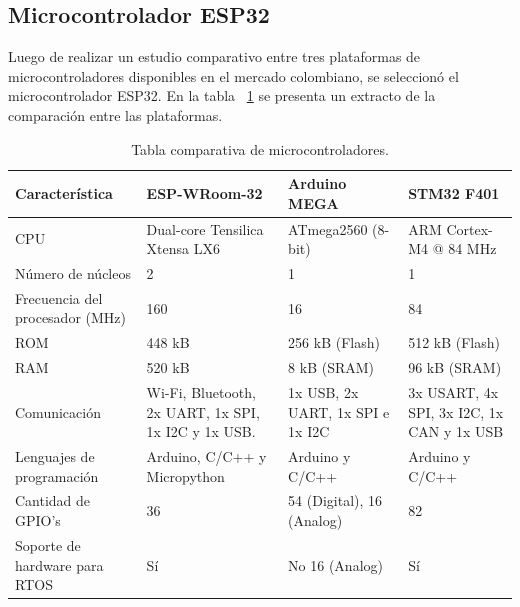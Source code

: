 \subsection{Microcontrolador ESP32}
\label{Microcontrolador}

Luego de realizar un estudio comparativo entre tres plataformas de microcontroladores disponibles en el mercado colombiano, se seleccionó el microcontrolador ESP32. En la tabla ~\ref{tabla:comparativa} se presenta un extracto de la comparación entre las plataformas. 

\begin{table}[h]
    \centering
    \caption{Tabla comparativa de microcontroladores.}
    \begin{tabular}{p{3cm} p{3cm} p{2.5cm} p{2.5cm} }
    \toprule

        \textbf{Característica}           & \textbf{ESP-WRoom-32}               & \textbf{Arduino MEGA}               & \textbf{STM32 F401} \\
        \midrule
        CPU                   & Dual-core Tensilica Xtensa LX6     & ATmega2560 (8-bit)                  & ARM Cortex-M4 @ 84 MHz               \\
        
        Número de núcleos       & 2                                  & 1                                  & 1                                   \\
        
        Frecuencia del procesador (MHz)  & 160                       & 16                                 & 84                                  \\

        ROM             & 448 kB                             & 256 kB (Flash)                     & 512 kB (Flash)                      \\

        RAM             & 520 kB                             & 8 kB (SRAM)                        & 96 kB (SRAM)                        \\

        Comunicación & Wi-Fi, Bluetooth, 2x UART, 1x SPI, 1x I2C y 1x USB.    & 1x USB, 2x UART, 1x SPI e 1x I2C                 & 3x USART, 4x SPI, 3x I2C, 1x CAN y 1x USB  \\

        Lenguajes de programación & Arduino, C/C++ y Micropython  & Arduino y C/C++               & Arduino y C/C++                  \\

        Cantidad de GPIO's        & 36            & 54 (Digital), 16 (Analog)           & 82                                  \\

        Soporte de hardware para RTOS & Sí        & No 16 (Analog)           & Sí                                 \\
    \bottomrule
    \hline
    \end{tabular}
    \label{tabla:comparativa}
\end{table}


